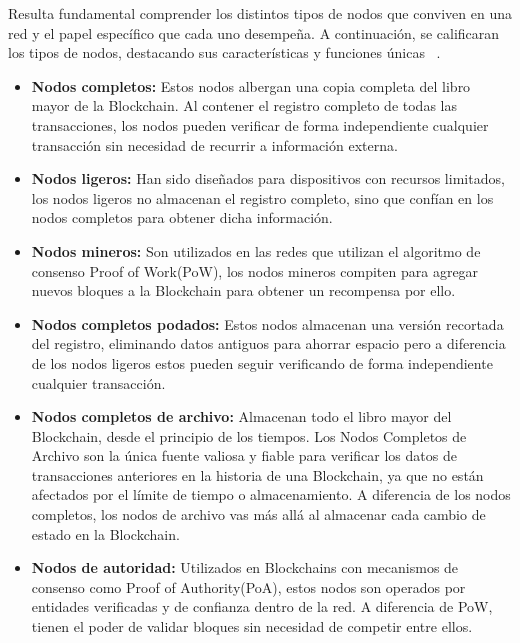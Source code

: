 
Resulta fundamental comprender los distintos tipos de nodos que conviven en una red y el papel específico que cada uno desempeña. A continuación, se calificaran los tipos de nodos, destacando sus características y funciones únicas ~\cite{tiposNodos}.

\begin{itemize}
\item \textbf{Nodos completos:} Estos nodos albergan una copia completa del libro mayor de la Blockchain. Al contener el registro completo de todas las transacciones, los nodos pueden verificar de forma independiente cualquier transacción sin necesidad de recurrir a información externa.

\item \textbf{Nodos ligeros:} Han sido diseñados para dispositivos con recursos limitados, los nodos ligeros no almacenan el registro completo, sino que confían en los nodos completos para obtener dicha información.

\item \textbf{Nodos mineros:} Son utilizados en las redes que utilizan el algoritmo de consenso Proof of Work(PoW), los nodos mineros compiten para agregar nuevos bloques a la Blockchain para obtener un recompensa por ello.

\item \textbf{Nodos completos podados:} Estos nodos almacenan una versión recortada del registro, eliminando datos antiguos para ahorrar espacio pero a diferencia de los nodos ligeros estos pueden seguir verificando de forma independiente cualquier transacción. 

\item \textbf{Nodos completos de archivo:} Almacenan todo el libro mayor del Blockchain, desde el principio de los tiempos. Los Nodos Completos de Archivo son la única fuente valiosa y fiable para verificar los datos de transacciones anteriores en la historia de una Blockchain, ya que no están afectados por el límite de tiempo o almacenamiento.
A diferencia de los nodos completos, los nodos de archivo vas más allá al almacenar cada cambio de estado en la Blockchain.

\item \textbf{Nodos de autoridad:} Utilizados en Blockchains con mecanismos de consenso como Proof of Authority(PoA), estos nodos son operados por entidades verificadas y de confianza dentro de la red. A diferencia de PoW, tienen el poder de validar bloques sin necesidad de competir entre ellos.


\end{itemize}

